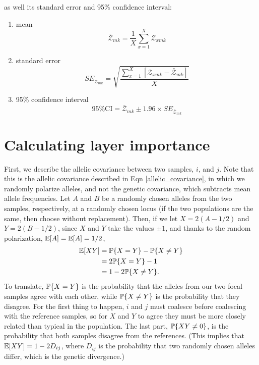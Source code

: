 \documentclass[12pt]{article}
\begin{document}
\begin{enumerate}
	as well its standard error and 95\% confidence interval:
	\begin{enumerate}
	\item mean
		\begin{equation}
			\bar{\mathcal{Z}}_{mk} = \frac{1}{X}\sum\limits_{x=1}^{X}\mathcal{Z}_{xmk}
		\end{equation}
	\item standard error
		\begin{equation}
			SE_{\bar{\mathcal{Z}}_{mk}} = \sqrt{\frac{\sum\limits_{x=1}^{X} \left[ {\mathcal{Z}_{xmk} - \bar{\mathcal{Z}}_{mk}} \right]}{X}}
		\end{equation}
	\item 95\% confidence interval
		\begin{equation}
			95\% \text{CI} = \bar{\mathcal{Z}}_{mk} \pm 1.96 \times SE_{\bar{\mathcal{Z}}_{mk}}
		\end{equation}
	\end{enumerate}
\end{enumerate}

\newpage
\section{Calculating layer importance}\label{layer_importance}
First, we describe the allelic covariance between two samples, $i$, and $j$.
Note that this is the allelic covariance described in Eqn \eqref{allelic_covariance},
in which we randomly polarize alleles,
and not the genetic covariance, which subtracts mean allele frequencies.
Let $A$ and $B$ be a randomly chosen alleles from the two samples, respectively,
at a randomly chosen locus 
(if the two populations are the same, then choose without replacement).
Then, if we let $X=2(A-1/2)$ and $Y=2(B-1/2)$,
since $X$ and $Y$ take the values $\pm 1$,
and thanks to the random polarization, $\E[A] = \E[A] = 1/2$,
$$\begin{aligned}
\E[XY]
        &= \P\{ X=Y \} - \P\{ X \neq Y \} \\
        &= 2 \P\{ X=Y \} - 1 \\
        &= 1 - 2 \P\{ X \neq Y \} .
\end{aligned}$$
To translate, $\P\{ X=Y \}$ is the probability that the alleles from our two focal samples agree with each other,
while $\P\{ X \neq Y \}$ is the probability that they disagree.
For the first thing to happen, $i$ and $j$ must coalesce before coalescing with the reference samples,
so for $X$ and $Y$ to agree they must be more closely related than typical in the population.
The last part, $\P\{ XY \neq 0\}$, is the probability that both samples disagree from the references.
(This implies that $\E[XY] = 1 - 2 D_{ij}$, 
where $D_{ij}$ is the probability that two randomly chosen alleles differ, 
which is the genetic divergence.) 
\end{document}
